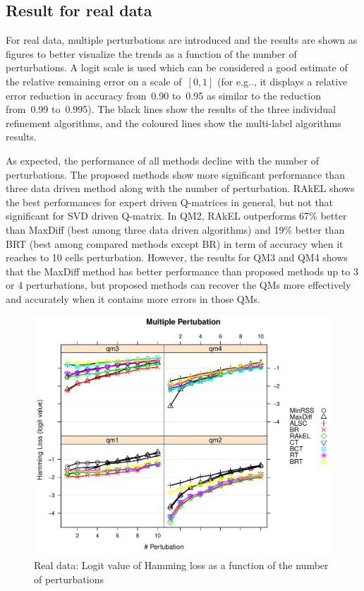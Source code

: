 \documentclass[12pt]{article}
\begin{document}
\subsection{Result for real data}
For real data, multiple perturbations are introduced and the results are shown as figures to better visualize the trends as a function of the number of perturbations.   A logit scale is used which can be considered a good estimate of the relative remaining error on a scale of~$[0,1]$ (for e.g.., it displays a relative error reduction in accuracy from~0.90 to~0.95 as similar to the reduction from~0.99 to~0.995). The black lines show the results of the three individual refinement algorithms, and the coloured lines show the multi-label algorithms results.  

As expected, the performance of all methods decline with the number of perturbations. The proposed methods show more significant performance than three data driven method along with the number of perturbation. RAkEL shows the best performances for expert driven Q-matrices in general, but not that significant for SVD driven Q-matrix. In QM2, RAkEL outperforms 67\% better than MaxDiff (best among three data driven algorithms) and 19\% better than BRT (best among compared methods except BR) in term of accuracy when it reaches to 10 cells perturbation.   However, the results for QM3 and QM4 shows that the MaxDiff method has better performance than proposed methods up to 3 or 4 perturbations, but proposed methods can recover the QMs more effectively and accurately when it contains more errors in those QMs.



\begin{figure}
  \centering
    \includegraphics[width=100 mm ,scale=0.25]{graph/HL.pdf}
  \caption{Real data: Logit value of Hamming loss as a function of the number of perturbations}\label{fig:HLforReal}
\end{figure}
\end{document}
